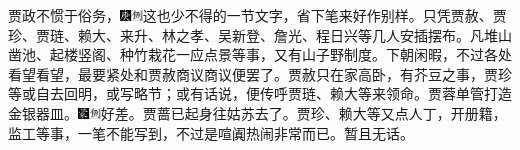 贾政不惯于俗务，{\includegraphics[width=3mm]{../Images/00004}\includegraphics[width=3mm]{../Images/00011}\footnotesize \kaishu 这也少不得的一节文字，省下笔来好作别样。}只凭贾赦、贾珍、贾琏、赖大、来升、林之孝、吴新登、詹光、程日兴等几人安插摆布。凡堆山凿池、起楼竖阁、种竹栽花一应点景等事，又有山子野制度。下朝闲暇，不过各处看望看望，最要紧处和贾赦商议商议便罢了。贾赦只在家高卧，有芥豆之事，贾珍等或自去回明，或写略节；或有话说，便传呼贾琏、赖大等来领命。贾蓉单管打造金银器皿。{\includegraphics[width=3mm]{../Images/00006}\includegraphics[width=3mm]{../Images/00011}\footnotesize \kaishu 好差。}贾蔷已起身往姑苏去了。贾珍、赖大等又点人丁，开册籍，监工等事，一笔不能写到，不过是喧阗热闹非常而已。暂且无话。

